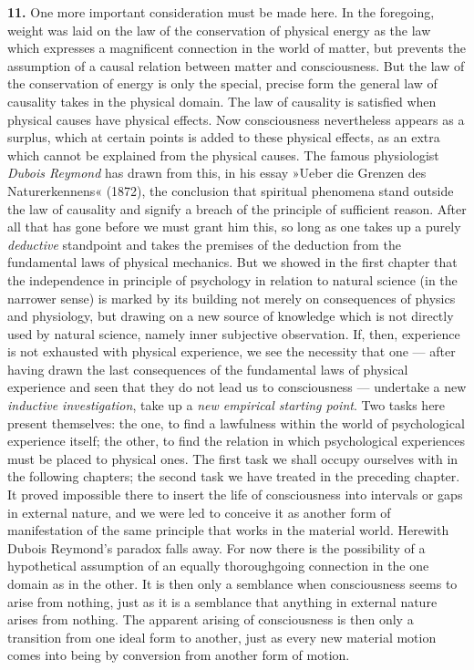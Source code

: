 \documentclass[12pt,a4paper]{book}
\newcommand{\opage}[1]{\marginnote{\footnotesize\textit{[#1]}}}
\begin{document}
\textbf{11.} One more important consideration must be made here. In the
foregoing, weight was laid on the law of the conservation of physical
energy as the law which expresses a magnificent connection in the world
of matter, but prevents the assumption of a causal relation between
matter and consciousness. But the law of the conservation of energy is
only the special, precise form the general law of causality takes in the
physical domain. The law of causality is satisfied when physical causes
have physical effects. Now consciousness nevertheless appears as a
surplus, which at certain points is added to these physical effects, as
an extra which cannot be explained from the physical causes. The famous
physiologist \emph{Dubois Reymond}
\opage{99}has drawn from this, in his essay »Ueber die Grenzen des
Naturerkennens« (1872), the conclusion that spiritual phenomena stand
outside the law of causality and signify a breach of the principle of
sufficient reason. After all that has gone before we must grant him this,
so long as one takes up a purely \emph{deductive} standpoint and takes
the premises of the deduction from the fundamental laws of physical
mechanics. But we showed in the first chapter that the independence in
principle of psychology in relation to natural science (in the narrower
sense) is marked by its building not merely on consequences of physics
and physiology, but drawing on a new source of knowledge which is not
directly used by natural science, namely inner subjective observation.
If, then, experience is not exhausted with physical experience, we see
the necessity that one --- after having drawn the last consequences of
the fundamental laws of physical experience and seen that they do not
lead us to consciousness --- undertake a new \emph{inductive
investigation}, take up a \emph{new empirical starting point}. Two tasks
here present themselves: the one, to find a lawfulness within the world
of psychological experience itself; the other, to find the relation in
which psychological experiences must be placed to physical ones. The
first task we shall occupy ourselves with in the following chapters; the
second task we have treated in the preceding chapter. It proved
impossible there to insert the life of consciousness into intervals or
gaps in external nature, and we were led to conceive it as another form
of manifestation of the same principle that works in the material world.
Herewith Dubois Reymond's paradox falls away. For now there is the
possibility of a hypothetical assumption of an equally thoroughgoing
connection in the one domain as in the other. It is then only a
semblance when consciousness seems to arise from nothing, just as it is a
semblance that anything in external nature arises from nothing. The
apparent arising of consciousness is then only a transition from one
ideal form to another, just as every new material motion comes into
being by conversion from another form of motion.
\end{document}

